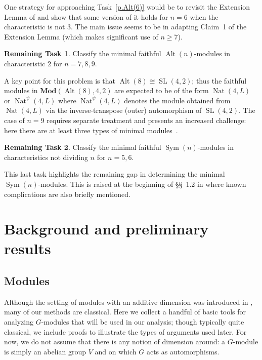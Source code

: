 \documentclass[a4paper, 11pt]{amsart}
\theoremstyle{plain}
\theoremstyle{definition}
\newtheorem{task}{Remaining Task}
\theoremstyle{remark}
\DeclareMathOperator{\Sym}{Sym}
\DeclareMathOperator{\Alt}{Alt}
\DeclareMathOperator{\SL}{SL}
\DeclareMathOperator{\Nat}{Nat}
\newcommand{\Mod}{\mathbf{Mod}}
\begin{document}
One strategy for approaching Task~\ref{p.Alt(6)} would be to revisit the Extension Lemma of \cite{CDW23} and show that some version of it holds for $n=6$ when the characteristic is not $3$. The main issue seems to be in adapting Claim~1 of the Extension Lemma (which makes significant use of $n\ge7$).

\begin{task}\label{p.AltInChar2}
Classify the minimal faithful $\Alt(n)$-modules in characteristic $2$ for $n=7,8,9$.
\end{task}

A key point for this problem is that $\Alt(8) \cong \SL(4,2)$; thus the faithful modules in $\Mod(\Alt(8),4,2)$ are expected to be of the form  $\Nat(4,L)$ or $\Nat^\psi(4,L)$ where $\Nat^\psi(4,L)$ denotes the module obtained from $\Nat(4,L)$ via the inverse-transpose (outer) automorphism of $\SL(4,2)$.  The case of $n=9$ requires separate treatment and presents an increased challenge: here there are at least three types of minimal modules~\cite{atlas3}.

\begin{task}\label{p.Sym(5)}
Classify the minimal faithful $\Sym(n)$-modules in characteristics not dividing $n$ for $n=5,6$.
\end{task}
This last task highlights the remaining gap in determining the minimal $\Sym(n)$-modules. This is raised at the beginning of \S\S~1.2 in \cite{CDW23} where known complications are also briefly mentioned.

\section{Background and preliminary results}


\subsection{Modules}\label{ss.modules}
Although the setting of modules with an additive dimension was introduced in \cite{CDW23}, many of our methods are classical. Here we collect a handful of basic tools for analyzing $G$-modules that will be used in our analysis; though typically quite classical, we include proofs to illustrate the types of arguments used later. For now, we do not assume that there is any notion of dimension around: a $G$-module is simply an abelian group $V$ and on which $G$ acts as automorphisms.
\end{document}
